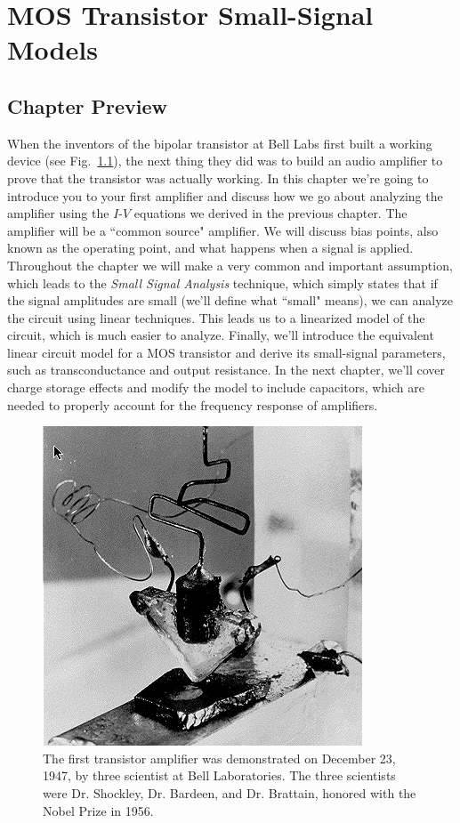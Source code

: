 
\chapter{MOS Transistor Small-Signal Models}


\graphicspath{{./figs_mos_ss_dc/}}


\section{Chapter Preview}

When the inventors of the bipolar transistor at Bell Labs first built a working device (see Fig.~\ref{fig:bjt_invent}), the next thing they did was to build an audio amplifier to prove that the transistor was actually working.  In this chapter we're going to introduce you to your first amplifier and discuss how we go about analyzing the amplifier using the $I$-$V$ equations we derived in the previous chapter.  The amplifier will be a ``common source" amplifier.  We will discuss bias points, also known as the operating point, and what happens when a signal is applied.  Throughout the chapter we will make a very common and important assumption, which leads to the \emph{Small Signal Analysis} technique, which simply states that if the signal amplitudes are small (we'll define what ``small" means), we can analyze the circuit using linear techniques. This leads us to a linearized model of the circuit, which is much easier to analyze.  Finally, we'll introduce the equivalent linear circuit model for a MOS transistor and derive its small-signal parameters, such as transconductance and output resistance.  In the next chapter, we'll cover charge storage effects and modify the model to include capacitors, which are needed to properly account for the frequency response of amplifiers.
 

\begin{figure}[tb]
\begin{center}
\includegraphics[width=.5\columnwidth]{bjt_invent.png}
\end{center}
\caption{The first transistor amplifier was demonstrated on December 23, 1947, by three scientist at Bell Laboratories.  The three scientists were Dr. Shockley, Dr. Bardeen, and Dr. Brattain, honored with the Nobel Prize in 1956.} \label{fig:bjt_invent}
\end{figure}



